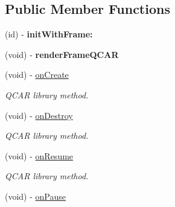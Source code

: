\subsection*{\-Public \-Member \-Functions}
\begin{DoxyCompactItemize}
\item 
\hypertarget{interface_e_a_g_l_view_q_c_a_r_ae3e5e59b8309c1814752a853fa47a979}{
(id) -\/ {\bfseries init\-With\-Frame\-:}}
\label{interface_e_a_g_l_view_q_c_a_r_ae3e5e59b8309c1814752a853fa47a979}

\item 
\hypertarget{interface_e_a_g_l_view_q_c_a_r_a99816e40f4e4c785f64f043ac6fb1477}{
(void) -\/ {\bfseries render\-Frame\-Q\-C\-A\-R}}
\label{interface_e_a_g_l_view_q_c_a_r_a99816e40f4e4c785f64f043ac6fb1477}

\item 
\hypertarget{interface_e_a_g_l_view_q_c_a_r_aec4cc00a46e5918f3cb7c12f1a864ffc}{
(void) -\/ \hyperlink{interface_e_a_g_l_view_q_c_a_r_aec4cc00a46e5918f3cb7c12f1a864ffc}{on\-Create}}
\label{interface_e_a_g_l_view_q_c_a_r_aec4cc00a46e5918f3cb7c12f1a864ffc}

\begin{DoxyCompactList}\small\item\em \-Q\-C\-A\-R library method. \end{DoxyCompactList}\item 
\hypertarget{interface_e_a_g_l_view_q_c_a_r_afd0ff8b02dc9ffbc104cb6662f1693a4}{
(void) -\/ \hyperlink{interface_e_a_g_l_view_q_c_a_r_afd0ff8b02dc9ffbc104cb6662f1693a4}{on\-Destroy}}
\label{interface_e_a_g_l_view_q_c_a_r_afd0ff8b02dc9ffbc104cb6662f1693a4}

\begin{DoxyCompactList}\small\item\em \-Q\-C\-A\-R library method. \end{DoxyCompactList}\item 
\hypertarget{interface_e_a_g_l_view_q_c_a_r_a2937ce7690f04e00a8b83ede63ca644a}{
(void) -\/ \hyperlink{interface_e_a_g_l_view_q_c_a_r_a2937ce7690f04e00a8b83ede63ca644a}{on\-Resume}}
\label{interface_e_a_g_l_view_q_c_a_r_a2937ce7690f04e00a8b83ede63ca644a}

\begin{DoxyCompactList}\small\item\em \-Q\-C\-A\-R library method. \end{DoxyCompactList}\item 
\hypertarget{interface_e_a_g_l_view_q_c_a_r_ae9bb1fb1664e38a5dcae81c0ee54e77f}{
(void) -\/ \hyperlink{interface_e_a_g_l_view_q_c_a_r_ae9bb1fb1664e38a5dcae81c0ee54e77f}{on\-Pause}}
\label{interface_e_a_g_l_view_q_c_a_r_ae9bb1fb1664e38a5dcae81c0ee54e77f}


\end{DoxyCompactItemize}
